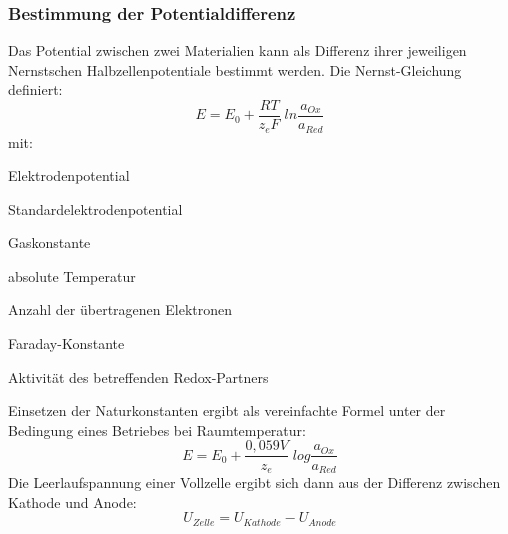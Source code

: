 \documentclass[a4paper, 11pt, headsepline,footsepline,twoside,abstract]{scrbook}
\begin{document}
\subsubsection{Bestimmung der Potentialdifferenz}
Das Potential zwischen zwei Materialien kann als Differenz ihrer jeweiligen Nernstschen Halbzellenpotentiale bestimmt werden. Die Nernst-Gleichung definiert:
\begin{equation}
E = E_0 + \frac{RT}{z_eF}\; ln \frac{a_{Ox}}{a_{Red}}
\end{equation}
mit:
\begin{description}\itemsep0pt
\item[E] Elektrodenpotential
\item[E$_0$] Standardelektrodenpotential
\item[R] Gaskonstante
\item[T] absolute Temperatur
\item[z$_e$] Anzahl der übertragenen Elektronen
\item[F] Faraday-Konstante
\item[a] Aktivität des betreffenden Redox-Partners
\end{description}
Einsetzen der Naturkonstanten ergibt als vereinfachte Formel unter der Bedingung eines Betriebes bei Raumtemperatur:
\begin{equation}
E = E_0 + \frac{0,059 V}{z_e} \; log \frac{a_{Ox}}{a_{Red}}
\end{equation}
Die Leerlaufspannung einer Vollzelle ergibt sich dann aus der Differenz zwischen Kathode und Anode:
\begin{equation}
U_{Zelle} = U_{Kathode} - U_{Anode}
\end{equation}
\end{document}

